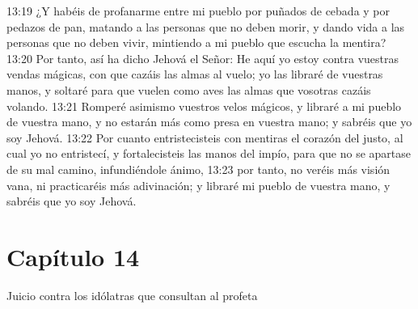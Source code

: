 13:19 ¿Y habéis de profanarme entre mi pueblo por puñados de cebada y por pedazos de pan, matando a las personas que no deben morir, y dando vida a las personas que no deben vivir, mintiendo a mi pueblo que escucha la mentira?   
13:20 Por tanto, así ha dicho Jehová el Señor: He aquí yo estoy contra vuestras vendas mágicas, con que cazáis las almas al vuelo; yo las libraré de vuestras manos, y soltaré para que vuelen como aves las almas que vosotras cazáis volando.   
13:21 Romperé asimismo vuestros velos mágicos, y libraré a mi pueblo de vuestra mano, y no estarán más como presa en vuestra mano; y sabréis que yo soy Jehová.   
13:22 Por cuanto entristecisteis con mentiras el corazón del justo, al cual yo no entristecí, y fortalecisteis las manos del impío, para que no se apartase de su mal camino, infundiéndole ánimo,   
13:23 por tanto, no veréis más visión vana, ni practicaréis más adivinación; y libraré mi pueblo de vuestra mano, y sabréis que yo soy Jehová.   
\section*{Capítulo 14 } 
Juicio contra los idólatras que consultan al profeta   
  
